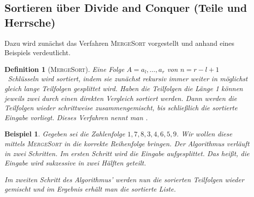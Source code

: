 \documentclass[ngerman,draft,parskip=half*,twoside]{scrreprt}
\theoremstyle{break}
\newtheorem{definition}{Definition}[chapter]
\newtheorem{bsp}{Beispiel}[chapter]
\theoremstyle{nonumberbreak}
\newcommand*{\highl}[2][]{\textbf{\boldmath{#2}}%
  \ifthenelse{\equal{#1}{}}{\index{#2}}{\index{#1}}%
}
\begin{document}
\subsection{Sortieren über Divide and Conquer (Teile und Herrsche)}
%
%
Dazu wird zunächst das Verfahren \textsc{MergeSort} vorgestellt und
anhand eines Beispiels verdeutlicht.
\begin{definition}[\textsc{MergeSort}]
  Eine Folge $A=a_l,\ldots, a_r$ von $n=r-l+1$~Schlüsseln wird
  sortiert, indem sie zunächst rekursiv immer weiter in möglichst
  gleich lange Teilfolgen gesplittet wird. Haben die Teilfolgen die
  Länge 1 können jeweils zwei durch einen direkten Vergleich sortiert
  werden. Dann werden die Teilfolgen wieder schrittweise
  zusammengemischt, bis schließlich die sortierte Eingabe
  vorliegt. Dieses Verfahren nennt man \highl{\textsc{MergeSort}}.
\end{definition}

\begin{bsp}
  Gegeben sei die Zahlenfolge $1,7,8,3,4,6,5,9$. Wir wollen diese
  mittels \textsc{MergeSort} in die korrekte Reihenfolge bringen. Der
  Algorithmus verläuft in zwei Schritten. Im ersten Schritt wird die
  Eingabe aufgesplittet. Das heißt, die Eingabe wird sukzessive in
  zwei Hälften geteilt.


Im zweiten Schritt des Algorithmus' werden nun die sorierten Teilfolgen wieder
gemischt und im Ergebnis erhält man die sortierte Liste.

\end{bsp}
\end{document}
